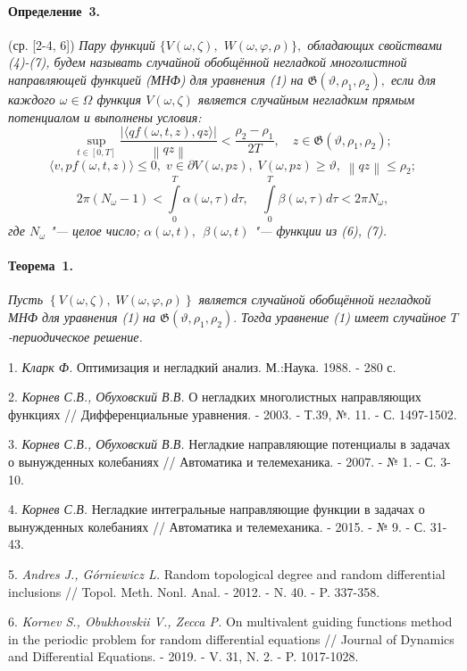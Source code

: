 \paragraph{Определение~3.} (ср. [2-4, 6])
{\it
Пару функций $\{ V(\omega,\zeta),$ \linebreak $W(\omega,\varphi,\rho ) \},$ обладающих свойствами (4)-(7),
будем называть случайной обобщённой негладкой многолистной на\-прав\-ляющей функцией (МНФ) для уравнения (1) на \linebreak $\mathfrak{G} \left({\vartheta ,\rho _{1} ,\rho _{2} } \right),$ если для каждого $\omega\in\Omega$ функция $V(\omega,\zeta)$ является случайным негладким прямым потенциалом и выполнены условия:
$$
 \mathop {\sup}\limits_{t \in \left[ {0,T} \right]}\frac{{\left| {\langle {qf(\omega, t, z),qz} \rangle} \right|}}{{\left\|{qz} \right\|}} < \frac{{\rho _{2} - \rho _{1} }}{{2T}},\quad z\in \mathfrak{G} (\vartheta ,\rho _{1} ,\rho _{2} );
$$
$$
\langle v, pf(\omega, t, z)\rangle \leq 0,\; v \in \partial V(\omega,pz),\; V(\omega,pz) \ge \vartheta ,\;\left\| {qz} \right\| \le \rho _{2};
$$
$$
2\pi (N_{\omega} - 1) < \int\limits_{0}^{T} {\alpha(\omega,\tau )d\tau } , \quad
\int\limits_{0}^{T} {\beta(\omega,\tau )d\tau < 2\pi N_{\omega}} ,
$$
где $N_{\omega}$ "--- целое число; $\alpha(\omega,t),\,\;\beta(\omega,t)$ "--- функции из (6), (7).
}

\paragraph{Теорема~1.}
{\it
Пусть $\left\{ {V(\omega,\zeta),\;W(\omega,\varphi,\rho )} \right\}$ является случайной обобщённой негладкой МНФ для уравнения (1) на \linebreak $\mathfrak{G} \left({\vartheta ,\rho _{1} ,\rho _{2} } \right).$   Тогда уравнение (1) имеет случайное $T$-пе\-риоди\-ческое ре\-ше\-ние.
}


\litlist

1. {\it Кларк Ф.}
Оптимизация и негладкий анализ. М.:Наука. 1988. - 280 с.

2. {\it Корнев С.В., Обуховский В.В.}
О негладких многолистных направляющих функциях // Дифференциальные уравнения. - 2003. - Т.39, №. 11. - С. 1497-1502.

3. {\it Корнев С.В., Обуховский В.В.}
Негладкие направляющие потенциалы в задачах о вынужденных колебаниях // Автоматика и телемеханика. - 2007. - № 1. - С. 3-10.

4. {\it Корнев С.В.}
Негладкие интегральные направляющие функции в задачах о вынужденных колебаниях // Автоматика и телемеханика. - 2015. - № 9. - С. 31-43.


5. {\it Andres J., G\'orniewicz L.}
Random topological degree and random differential inclusions // Topol. Meth. Nonl. Anal. - 2012. - N. 40. - P. 337-358.

6. {\it Kornev S., Obukhovskii V., Zecca P.}
On multivalent guiding functions method in the periodic problem for random differential equations // Journal of Dynamics and Differential Equations. - 2019. - V. 31, N. 2. - P. 1017-1028.
